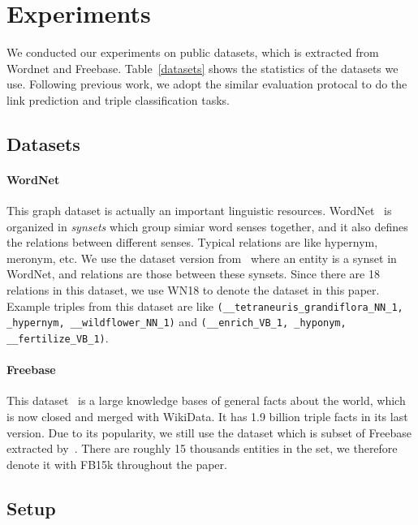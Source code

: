 \documentclass[twocolumn,a4paper,preprint,10pt,3p]{elsarticle}
\begin{document}
\section{Experiments}


We conducted our experiments on public datasets, which is extracted from Wordnet and Freebase. Table~\ref{datasets} shows the statistics of the datasets we use. Following previous work, we adopt the similar evaluation protocal to do the link prediction and triple classification tasks.


\subsection{Datasets}

\paragraph{WordNet} This graph dataset is actually an important linguistic resources. WordNet~\cite{miller1995wordnet} is organized in \emph{synsets} which group simiar word senses together, and it also defines the relations between different senses. Typical relations are like hypernym, meronym, etc. We use the dataset version from~\cite{bordes2014SME} where an entity is a synset in WordNet, and relations are those between these synsets. Since there are 18 relations in this dataset, we use WN18 to denote the dataset in this paper. Example triples from this dataset are like \texttt{({\_}{\_}tetraneuris{\_}grandiflora{\_}NN{\_}1, {\_}hypernym, {\_}{\_}wildflower{\_}NN{\_}1)} and \texttt{({\_}{\_}enrich{\_}VB{\_}1, {\_}hyponym, {\_}{\_}fertilize{\_}VB{\_}1)}.

\paragraph{Freebase} This dataset~\cite{bollacker2008freebase} is a large knowledge bases of general facts about the world, which is now closed and merged with WikiData. It has 1.9 billion triple facts in its last version. Due to its popularity, we still use the dataset which is subset of Freebase extracted by~\cite{TransE2013}. There are roughly 15 thousands entities in the set, we therefore denote it with FB15k throughout the paper.


\subsection{Setup}
\end{document}
